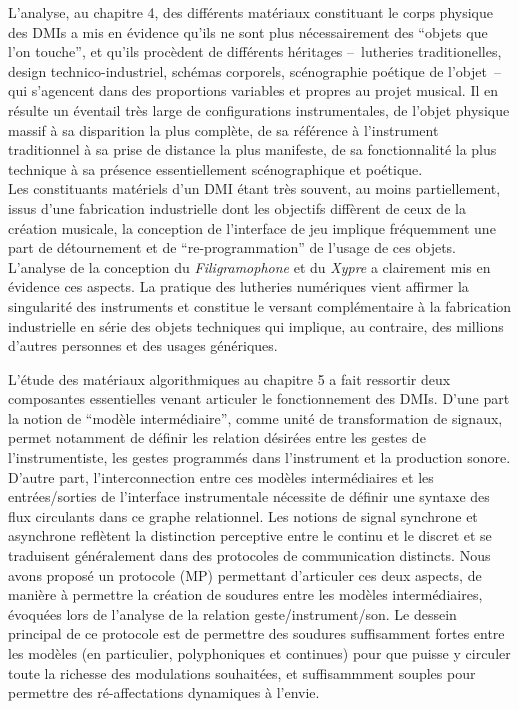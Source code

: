 \noindent L'analyse, au chapitre 4, des différents matériaux constituant le corps physique des \glspl{DMI} a mis en évidence qu'ils ne sont plus nécessairement des ``objets que l'on touche'', et qu'ils procèdent de différents héritages --~lutheries traditionelles, design technico-industriel, schémas corporels, scénographie poétique de l'objet~-- qui s'agencent dans des proportions variables et propres au projet musical. Il en résulte un éventail très large de configurations instrumentales, de l'objet physique massif à sa disparition la plus complète, de sa référence à l'instrument traditionnel à sa prise de distance la plus manifeste, de sa fonctionnalité la plus technique à sa présence essentiellement scénographique et poétique.\\
\indent Les constituants matériels d'un \gls{DMI} étant très souvent, au moins partiellement, issus d'une fabrication industrielle dont les objectifs diffèrent de ceux de la création musicale, la conception de l'interface de jeu implique fréquemment une part de détournement et de ``re-programmation'' de l'usage de ces objets. L'analyse de la conception du \textit{Filigramophone} et du \textit{Xypre} a clairement mis en évidence ces aspects. La pratique  des lutheries numériques vient affirmer la singularité des instruments et constitue le versant complémentaire à la fabrication industrielle en série des objets techniques qui implique, au contraire, des millions d'autres personnes et des usages génériques.



\noindent L'étude des matériaux algorithmiques au chapitre 5 a fait ressortir deux composantes essentielles venant articuler le fonctionnement des \glspl{DMI}. D'une part la notion de ``modèle intermédiaire'', comme unité de transformation de signaux, permet notamment de définir les relation désirées entre les gestes de l'instrumentiste, les gestes programmés dans l'instrument et la production sonore. D'autre part, l'interconnection entre ces modèles intermédiaires et les entrées/sorties de l'interface instrumentale nécessite de définir une syntaxe des flux circulants dans ce graphe relationnel. Les notions de signal synchrone et asynchrone reflètent la distinction perceptive entre le continu et le discret et se traduisent généralement dans des protocoles de communication distincts. Nous avons proposé un protocole (MP) permettant d'articuler ces deux aspects, de manière à permettre la création de soudures entre les modèles intermédiaires, évoquées lors de l'analyse de la relation geste/instrument/son. Le dessein principal de ce protocole est de permettre des soudures suffisamment fortes entre les modèles (en particulier, polyphoniques et continues) pour que puisse y circuler toute la richesse des modulations souhaitées, et suffisammment souples pour permettre des ré-affectations dynamiques à l'envie.


